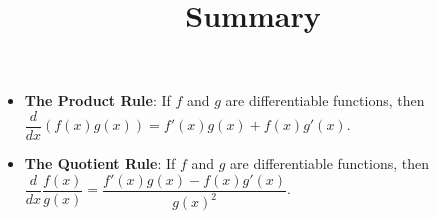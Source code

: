 \documentclass{ximera}
\title[Summary]{Summary}
\begin{document}
\begin{abstract} \end{abstract}
\maketitle



\begin{itemize}
	\item \textbf{The Product Rule}: If $f$ and $g$ are differentiable functions, then 
		$\displaystyle \dfrac{d}{dx} \left( f(x) g(x) \right) = f'(x) g(x) + f(x)g'(x)$.\\[2em]

	\item \textbf{The Quotient Rule}: If $f$ and $g$ are differentiable functions, then 
		$\displaystyle \dfrac{d}{dx} \dfrac{ f(x)}{g(x)} = \dfrac{f'(x) g(x) - f(x)g'(x)}{g(x)^2}$.

\end{itemize}
\end{document}
